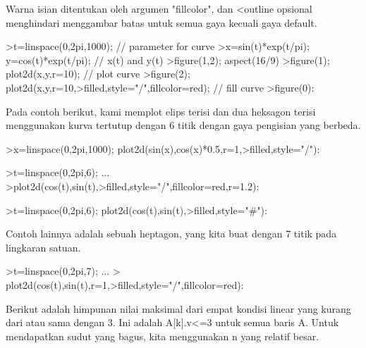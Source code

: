 \documentclass[a4paper,10pt]{article}
\begin{document}
\begin{eulernotebook}
\begin{eulercomment}
\begin{eulercomment}
\begin{eulercomment}
\begin{eulercomment}
\begin{eulercomment}
\begin{eulercomment}
\begin{eulercomment}
Warna isian ditentukan oleh argumen "fillcolor", dan \textless{}outline opsional
menghindari menggambar batas untuk semua gaya kecuali gaya default.
\end{eulercomment}
\begin{eulerprompt}
>t=linspace(0,2pi,1000); // parameter for curve
>x=sin(t)*exp(t/pi); y=cos(t)*exp(t/pi); // x(t) and y(t)
>figure(1,2); aspect(16/9)
>figure(1); plot2d(x,y,r=10); // plot curve
>figure(2); plot2d(x,y,r=10,>filled,style="/",fillcolor=red); // fill curve
>figure(0):
\end{eulerprompt}
\begin{eulercomment}
Pada contoh berikut, kami memplot elips terisi dan dua heksagon terisi
menggunakan kurva tertutup dengan 6 titik dengan gaya pengisian yang
berbeda.
\end{eulercomment}
\begin{eulerprompt}
>x=linspace(0,2pi,1000); plot2d(sin(x),cos(x)*0.5,r=1,>filled,style="/"):
\end{eulerprompt}
\begin{eulerprompt}
>t=linspace(0,2pi,6); ...
>plot2d(cos(t),sin(t),>filled,style="/",fillcolor=red,r=1.2):
\end{eulerprompt}
\begin{eulerprompt}
>t=linspace(0,2pi,6); plot2d(cos(t),sin(t),>filled,style="#"):
\end{eulerprompt}
\begin{eulercomment}
Contoh lainnya adalah sebuah heptagon, yang kita buat dengan 7 titik
pada lingkaran satuan.
\end{eulercomment}
\begin{eulerprompt}
>t=linspace(0,2pi,7);  ...
> plot2d(cos(t),sin(t),r=1,>filled,style="/",fillcolor=red):
\end{eulerprompt}
\begin{eulercomment}
Berikut adalah himpunan nilai maksimal dari empat kondisi linear yang
kurang dari atau sama dengan 3. Ini adalah A[k].v\textless{}=3 untuk semua baris
A. Untuk mendapatkan sudut yang bagus, kita menggunakan n yang relatif
besar.
\end{eulercomment}
\begin{eulerprompt}

\end{eulerprompt}
\end{eulercomment}
\end{eulercomment}
\end{eulercomment}
\end{eulercomment}
\end{eulercomment}
\end{eulercomment}
\end{eulernotebook}
\end{document}
